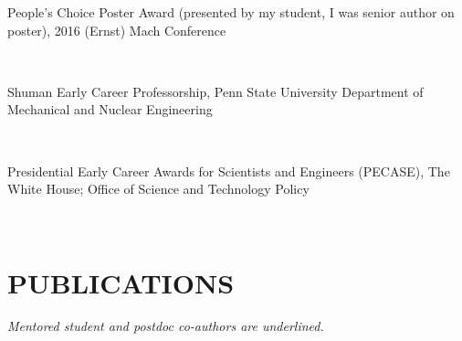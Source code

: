 \documentclass[a4paper,10pt]{article}
\begin{document}
        \noindent \parbox[t]{0.8\linewidth}{\raggedright People's Choice Poster Award (presented by my student, I was senior author on poster), 2016 (Ernst) Mach Conference} \hfill \parbox[t]{0.2\linewidth}{} \\
        
        \noindent \parbox[t]{0.8\linewidth}{\raggedright Shuman Early Career Professorship, Penn State University Department of Mechanical and Nuclear Engineering} \hfill \parbox[t]{0.2\linewidth}{} \\
        
        \noindent \parbox[t]{0.8\linewidth}{\raggedright Presidential Early Career Awards for Scientists and Engineers (PECASE), The White House; Office of Science and Technology Policy} \hfill \parbox[t]{0.2\linewidth}{} \\
        

    \section*{PUBLICATIONS}
    \textit{Mentored student and postdoc co-authors are underlined.}
\end{document}
